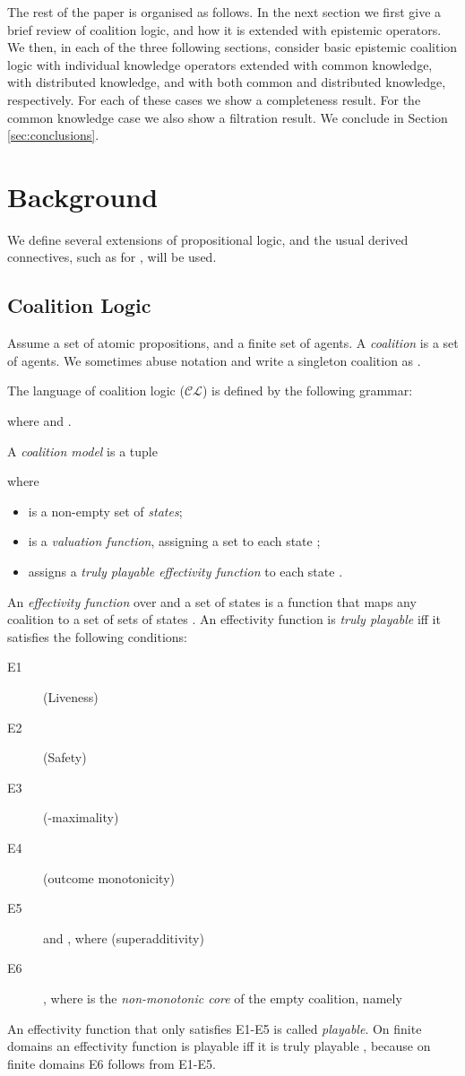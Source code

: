 \documentclass{article}
\newcommand{\acro}[1]{\ensuremath{\mathcal{#1}}}
\begin{document}
The rest of the paper is organised as follows. In the next section we
first give a brief review of coalition logic, and how it is extended
with epistemic operators. We then, in each of the three following
sections, consider basic epistemic coalition logic with individual
knowledge operators extended with common knowledge, with distributed
knowledge, and with both common and distributed knowledge,
respectively. For each of these cases we show a completeness
result. For the common knowledge case we also show a filtration
result. We conclude in Section \ref{sec:conclusions}.


\section{Background}

We define several extensions of propositional logic, and the usual
derived connectives, such as  for , will be used.

\subsection{Coalition Logic}

Assume a set  of atomic propositions, and a finite set
 of agents. A \emph{coalition} is a set 
of agents. We sometimes abuse notation and write a singleton coalition
 as .

The language of coalition logic (\acro{CL}) is defined by the
following grammar:

where  and .

A \emph{coalition model} is a tuple

where 
\begin{itemize}
\item  is a non-empty set of \emph{states};
\item  is a \emph{valuation function}, assigning a set  to each state ;
\item  assigns a \emph{truly playable effectivity function}  to each state
.
\end{itemize}
An \emph{effectivity function} \cite{pauly:2002a} over  and a
set of states  is a function  that maps any coalition  to a set of sets of states . An
effectivity function is \emph{truly playable}
\cite{pauly:2002a,goranko:2011} iff it satisfies the following
conditions:
\begin{description}
\item[E1]  (Liveness)
\item[E2]  (Safety)
\item[E3]  (-maximality)
\item[E4]  (outcome monotonicity)
\item[E5]   and 
, where  (superadditivity)
\item[E6] , where  is
the \emph{non-monotonic core} of the empty coalition, namely

\end{description}
An effectivity function that only satisfies E1-E5 is called
\emph{playable}. On finite domains an effectivity function is playable
iff it is truly playable \cite{goranko:2011}, because on finite domains E6
follows from E1-E5.
\end{document}
